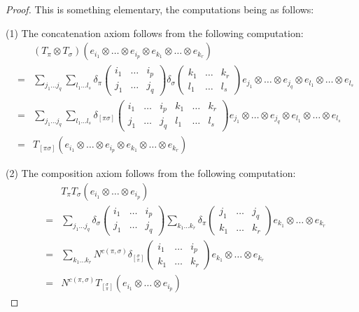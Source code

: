 \documentclass[12pt]{amsbook}
\begin{document}
\begin{proof}
This is something elementary, the computations being as follows:

\medskip

(1) The concatenation axiom follows from the following computation:
\begin{eqnarray*}
&&(T_\pi\otimes T_\sigma)(e_{i_1}\otimes\ldots\otimes e_{i_p}\otimes e_{k_1}\otimes\ldots\otimes e_{k_r})\\
&=&\sum_{j_1\ldots j_q}\sum_{l_1\ldots l_s}\delta_\pi\begin{pmatrix}i_1&\ldots&i_p\\j_1&\ldots&j_q\end{pmatrix}\delta_\sigma\begin{pmatrix}k_1&\ldots&k_r\\l_1&\ldots&l_s\end{pmatrix}e_{j_1}\otimes\ldots\otimes e_{j_q}\otimes e_{l_1}\otimes\ldots\otimes e_{l_s}\\
&=&\sum_{j_1\ldots j_q}\sum_{l_1\ldots l_s}\delta_{[\pi\sigma]}\begin{pmatrix}i_1&\ldots&i_p&k_1&\ldots&k_r\\j_1&\ldots&j_q&l_1&\ldots&l_s\end{pmatrix}e_{j_1}\otimes\ldots\otimes e_{j_q}\otimes e_{l_1}\otimes\ldots\otimes e_{l_s}\\
&=&T_{[\pi\sigma]}(e_{i_1}\otimes\ldots\otimes e_{i_p}\otimes e_{k_1}\otimes\ldots\otimes e_{k_r})
\end{eqnarray*}

(2) The composition axiom follows from the following computation:
\begin{eqnarray*}
&&T_\pi T_\sigma(e_{i_1}\otimes\ldots\otimes e_{i_p})\\
&=&\sum_{j_1\ldots j_q}\delta_\sigma\begin{pmatrix}i_1&\ldots&i_p\\j_1&\ldots&j_q\end{pmatrix}
\sum_{k_1\ldots k_r}\delta_\pi\begin{pmatrix}j_1&\ldots&j_q\\k_1&\ldots&k_r\end{pmatrix}e_{k_1}\otimes\ldots\otimes e_{k_r}\\
&=&\sum_{k_1\ldots k_r}N^{c(\pi,\sigma)}\delta_{[^\sigma_\pi]}\begin{pmatrix}i_1&\ldots&i_p\\k_1&\ldots&k_r\end{pmatrix}e_{k_1}\otimes\ldots\otimes e_{k_r}\\
&=&N^{c(\pi,\sigma)}T_{[^\sigma_\pi]}(e_{i_1}\otimes\ldots\otimes e_{i_p})
\end{eqnarray*}


\end{proof}
\end{document}
